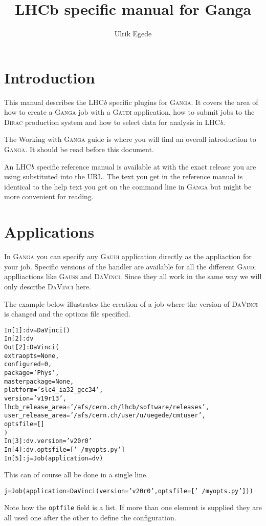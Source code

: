 \documentclass{howto}
\title{LHCb specific manual for Ganga \totalv}
\author{Ulrik Egede}
\def\ganga {\textsc{Ganga}\xspace}
\def\lhcb {LHC{\em b\/}\xspace}
\def\gaudi {\textsc{Gaudi}\xspace}
\def\davinci {\textsc{DaVinci}\xspace}
\def\dirac {\textsc{Dirac}\xspace}
\def\gauss {\textsc{Gauss}\xspace}
\def\davinciv {v20r0\xspace}
\begin{document}
\maketitle
\tableofcontents

\section{Introduction}
\noindent
This manual describes the \lhcb specific plugins for \ganga. It covers the
area of how to create a \ganga job with a \gaudi application, how to submit
jobs to the \dirac production system and how to select data for analysis in
\lhcb.

\begin{seealso}
  The Working with \ganga guide is where you will find an overall introduction
  to \ganga. It should be read before this document.
\end{seealso}

\begin{seealso}
  An \lhcb specific reference manual is available at 
  with the exact release you are using substituted into the URL. The text you
  get in the reference manual is identical to the help text you get on the
  command line in \ganga but might be more convenient for reading.
\end{seealso}

\section{Applications}
\label{sec:gaudi}
In \ganga you can specify any \gaudi application directly as the appliaction
for your job. Specific versions of the handler are available for all the
different \gaudi applliactions like \gauss and \davinci. Since they all work
in the same way we will only describe \davinci here.

The example below illustrates the creation of a job where the version of
\davinci is changed and the options file specified.
\begin{alltt}
In [1]: dv = DaVinci()
In [2]: dv
Out[2]: DaVinci (
 extraopts = None ,
 configured = 0 ,
 package = 'Phys' ,
 masterpackage = None ,
 platform = 'slc4_ia32_gcc34' ,
 version = 'v19r13' ,
 lhcb_release_area = '/afs/cern.ch/lhcb/software/releases' ,
 user_release_area = '/afs/cern.ch/user/u/uegede/cmtuser' ,
 optsfile = []
 )
In [3]: dv.version='\davinciv'
In [4]: dv.optsfile=['~/myopts.py']
In [5]: j = Job(application=dv)
\end{alltt}
This can of course all be done in a single line.
\begin{alltt}
j = Job(application=DaVinci(version='\davinciv', optsfile=['~/myopts.py']))
\end{alltt}
Note how the \texttt{optfile} field is a list. If more than one element is
supplied they are all used one after the other to define the configuration.
\end{document}
